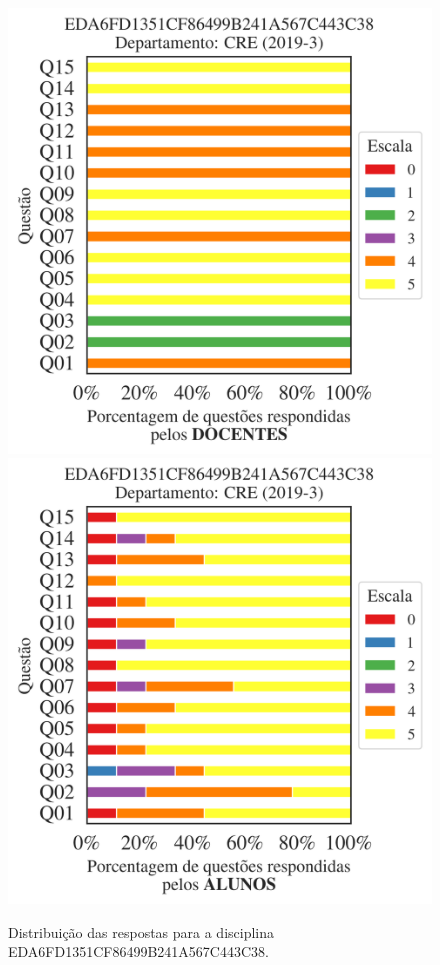 \documentclass[a4paper,10pt]{article}
\begin{document}
\begin{figure}[h]
\centering
\includegraphics[width=0.485\linewidth]{analise_disciplina_departamento_CRE_EDA6FD1351CF86499B241A567C443C38_docentes.png}
\includegraphics[width=0.485\linewidth]{analise_disciplina_departamento_CRE_EDA6FD1351CF86499B241A567C443C38_alunos.png}
\caption{\label{fig:analise_geral_departamento}                Distribuição das respostas para a disciplina EDA6FD1351CF86499B241A567C443C38. }
\end{figure}
\end{document}
